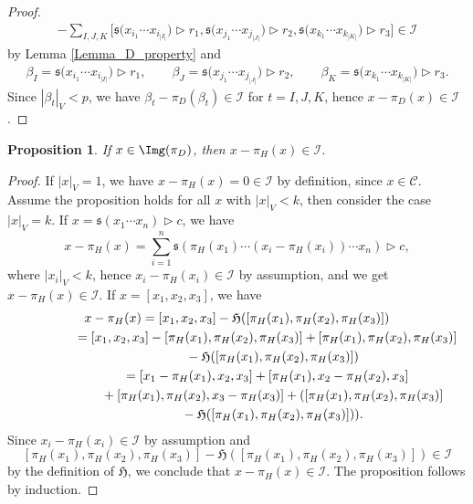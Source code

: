 \documentclass[pdftex]{sigma}
\numberwithin{equation}{section}
\newtheorem{Proposition}[Theorem]{Proposition}
 { \theoremstyle{definition}
\newtheorem{Definition}[Theorem]{Definition}
\newtheorem{Note}[Theorem]{Note}
\newtheorem{Example}[Theorem]{Example}
\newtheorem{Remark}[Theorem]{Remark} }
\begin{document}
\begin{proof}
\begin{gather*}
- \sum_{I,J,K} \bigl[ \mathfrak{s}\bigl(x_{i_1} \cdots x_{i_{|I|}}\bigr) \rhd r_1, \mathfrak{s}\bigl(x_{j_1} \cdots x_{j_{|J|}}\bigr) \rhd r_2, \mathfrak{s}\bigl(x_{k_1} \cdots x_{k_{|K|}}\bigr) \rhd r_3\bigr] \in \mathcal{I}
\end{gather*}
by Lemma \ref{Lemma_D_property} and
\begin{gather*}
 \beta_I = \mathfrak{s}\bigl(x_{i_1} \cdots x_{i_{|I|}}\bigr) \rhd r_1, \qquad
 \beta_J = \mathfrak{s}\bigl(x_{j_1} \cdots x_{j_{|J|}}\bigr)\rhd r_2, \qquad
 \beta_K = \mathfrak{s}\bigl(x_{k_1} \cdots x_{k_{|K|}}\bigr) \rhd r_3.
\end{gather*}
Since $|\beta_t|_V < p$, we have $\beta_t - \pi_D(\beta_t) \in \mathcal{I}$ for $t = I,J,K$, hence $x-\pi_D(x) \in \mathcal{I}$.
\end{proof}

\begin{Proposition}\label{id-h_in_I}
If $x \in \Img(\pi_D)$, then $x-\pi_H(x) \in \mathcal{I}$.
\end{Proposition}

\begin{proof}
If $|x|_V = 1$, we have $x-\pi_H(x) = 0 \in \mathcal{I}$ by definition, since $x \in \mathcal{C}$. Assume the proposition holds for all $x$ with $|x|_V<k$, then consider the case $|x|_V=k$. %
If $x = \mathfrak{s}(x_1 \cdots x_n) \rhd c$, we have
\[
x-\pi_H(x) = \sum_{i=1}^n \mathfrak{s}(\pi_H(x_1) \cdots (x_i - \pi_H(x_i)) \cdots x_n) \rhd c,
\]
where $|x_i|_V <k$, hence $x_i - \pi_H(x_i) \in \mathcal{I}$ by assumption, and we get $x-\pi_H(x) \in \mathcal{I}$. If $x = [x_1 ,x_2, x_3]$, we have
\begin{gather*}
 x- \pi_H(x) = [x_1, x_2, x_3] - \mathfrak{H}([\pi_H(x_1), \pi_H(x_2), \pi_H(x_3)]) \\ \hphantom{x- \pi_H(x)}{}
 = [x_1, x_2, x_3] - [\pi_H(x_1), \pi_H(x_2), \pi_H(x_3)] + [\pi_H(x_1), \pi_H(x_2), \pi_H(x_3)]\\ \hphantom{x- \pi_H(x)=}{}
 - \mathfrak{H}([\pi_H(x_1), \pi_H(x_2), \pi_H(x_3)]) \\ \hphantom{x- \pi_H(x)}{}
 = [x_1 - \pi_H(x_1), x_2 , x_3] + [\pi_H(x_1), x_2 - \pi_H(x_2), x_3]\\ \hphantom{x- \pi_H(x)=}{}
 + [\pi_H(x_1), \pi_H(x_2), x_3 - \pi_H(x_3)]+ ( [\pi_H(x_1), \pi_H(x_2), \pi_H(x_3)] \\ \hphantom{x- \pi_H(x)=}{}
 - \mathfrak{H}([\pi_H(x_1), \pi_H(x_2), \pi_H(x_3)]) ).
\end{gather*}
Since $x_i - \pi_H(x_i) \in \mathcal{I}$ by assumption and
\[
[\pi_H(x_1), \pi_H(x_2), \pi_H(x_3)] - \mathfrak{H}([\pi_H(x_1), \pi_H(x_2), \pi_H(x_3)]) \in \mathcal{I}
\]
 by the definition of $\mathfrak{H}$, we conclude that $x-\pi_H(x) \in \mathcal{I}$. The proposition follows by induction.
\end{proof}
\end{document}
